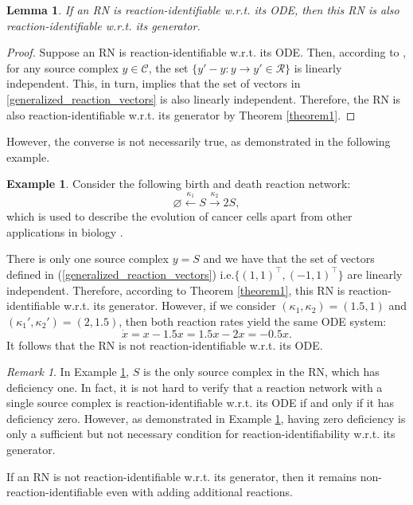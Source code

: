 \documentclass[10pt,a4paper]{amsart}
\let\emptyset\varnothing
\newtheorem{lemma}[theorem]{Lemma}
\theoremstyle{definition}
\newtheorem{example}[theorem]{Example}
\theoremstyle{remark}
\newtheorem{remark}[theorem]{Remark}
\theoremstyle{consequence}
\def\k{\kappa}
\def\cR{\mathcal{R}}
\def\cC{\mathcal{C}}
\numberwithin{equation}{section}
\begin{document}
\begin{lemma}\label{conseq_lemma}
{If an RN is reaction-identifiable  w.r.t. its ODE, then this RN is also reaction-identifiable w.r.t. its generator.}
\end{lemma}
{\begin{proof}
 Suppose an RN is reaction-identifiable  w.r.t. its ODE. Then, according to \cite[Theorem 3.2]{ident_CRNs}, for any source complex $y \in \cC$, the set $\{y' - y \colon y \to y' \in \cR\}$ is linearly independent. This, in turn, implies that the set of vectors in \eqref{generalized_reaction_vectors} is also linearly independent. Therefore, the RN is also reaction-identifiable w.r.t. its generator by Theorem \ref{theorem1}.
\end{proof}
}


However, the converse is not necessarily true, as demonstrated in the following example.

\begin{example}\label{ex_ODE_yes_SDE_no}
Consider the following birth and death reaction network:
$$\emptyset\xleftarrow{\kappa_1} S\xrightarrow{\kappa_2} 2S,$$
which is used to describe the evolution of cancer cells apart from other applications in biology \cite{10.1093/bib/bbk006}. 


There is only one source complex $y = S$ and we have that the set of vectors defined in (\ref{generalized_reaction_vectors}) i.e.$ \{ (1,1)^{\intercal},  (-1,1)^{\intercal}\}$ are linearly independent. Therefore, according to Theorem \ref{theorem1}, this RN is reaction-identifiable w.r.t. its generator. 
However, if we consider $(\k_1,\k_2) = (1.5,1)$ and $(\k_1',\k_2') = (2,1.5)$, then both reaction rates yield the same ODE system:
\[
  \dot{x} = x-1.5x = 1.5x-2x=-0.5x.
  \]
It follows that the RN is not reaction-identifiable w.r.t. its ODE.
\end{example}
\begin{remark}
  In Example \ref{ex_ODE_yes_SDE_no}, $S$ is the only source complex in the RN, which has deficiency one. In fact, it is not hard to verify that a reaction network with a single source complex is reaction-identifiable w.r.t. its ODE if and only if it has deficiency zero. However, as demonstrated in Example \ref{ex_ODE_yes_SDE_no}, having zero deficiency is only a sufficient but not necessary condition for reaction-identifiability w.r.t. its generator.
\end{remark}

If an RN is not reaction-identifiable w.r.t. its generator, then it remains non-reaction-identifiable even with adding additional reactions.
\end{document}
